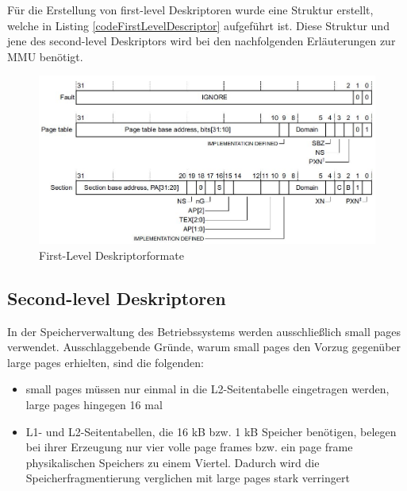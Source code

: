 Für die Erstellung von first-level Deskriptoren wurde eine Struktur erstellt, welche in Listing \ref{codeFirstLevelDescriptor} aufgeführt ist. Diese Struktur und jene des second-level Deskriptors wird bei den nachfolgenden Erläuterungen zur MMU benötigt.\\

\begin{figure}[H]
	\includegraphics[scale=0.7]{chapters/mmu/figures/firstLevelDescriptor}
	\caption{First-Level Deskriptorformate \cite[S. B3-1326]{ARM:ARM}}
	\label{fig:firstLevelDescriptor}
\end{figure}




\subsection*{Second-level Deskriptoren}

In der Speicherverwaltung des Betriebssystems werden ausschließlich small pages verwendet. Ausschlaggebende Gründe, warum small pages den Vorzug gegenüber large pages erhielten, sind die folgenden:

\begin{itemize}
	\item small pages müssen nur einmal in die L2-Seitentabelle eingetragen werden, large pages hingegen 16 mal
	\item L1- und L2-Seitentabellen, die 16 kB bzw. 1 kB Speicher benötigen, belegen bei ihrer Erzeugung nur vier volle page frames bzw. ein page frame physikalischen Speichers zu einem Viertel. Dadurch wird die Speicherfragmentierung verglichen mit large pages stark verringert
\end{itemize}

